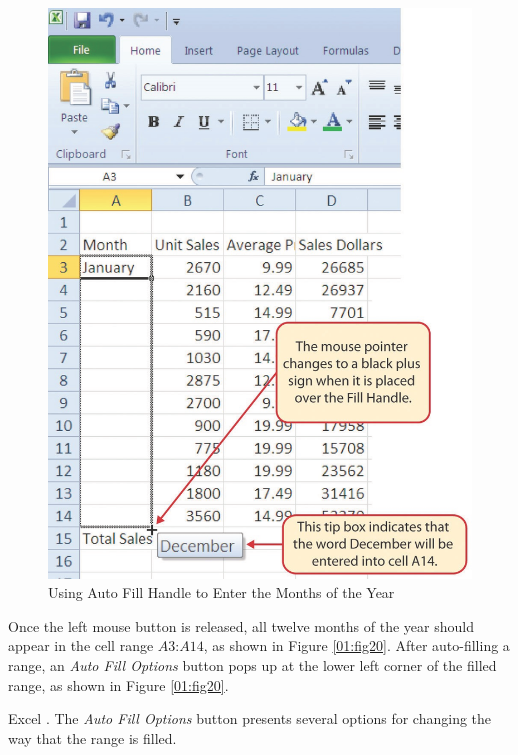 \begin{figure}[H]
	\centering
	\includegraphics[width=\maxwidth{.95\linewidth}]{gfx/ch01_fig19}
	\caption{Using Auto Fill Handle to Enter the Months of the Year}
	\label{01:fig19}
\end{figure}

Once the left mouse button is released, all twelve months of the year should appear in the cell range $ A3 $:$ A14 $, as shown in Figure \ref{01:fig20}. After auto-filling a range, an \textit{Auto Fill Options} button pops up at the lower left corner of the filled range, as shown in Figure \ref{01:fig20}. 

Excel . The \textit{Auto Fill Options} button presents several options for changing the way that the range is filled.

